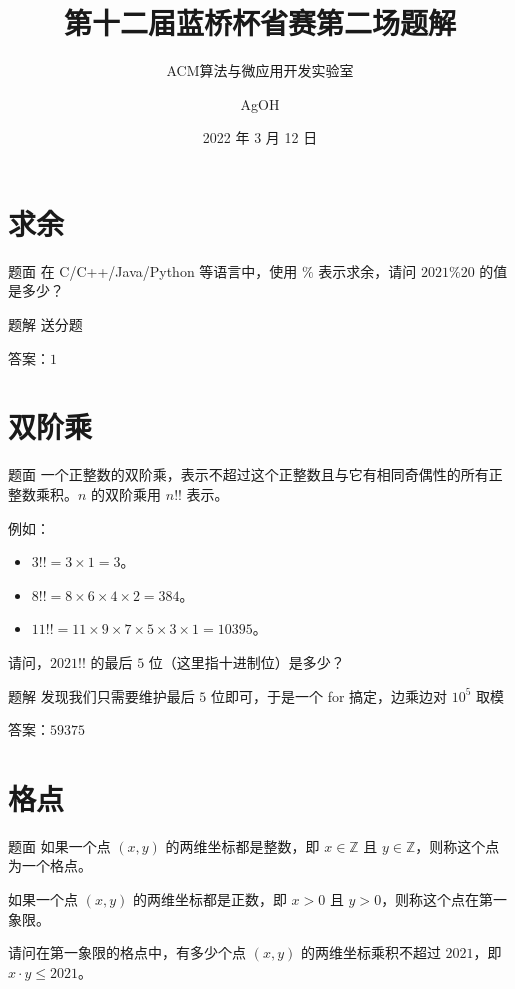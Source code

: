 \documentclass{pptt}
\title{第十二届蓝桥杯省赛第二场题解}
\author{ACM算法与微应用开发实验室 \and AgOH}
\date{2022 年 3 月 12 日}
\begin{document}
\maketitle

\section{求余}

\begin{frame}{题面}
    在 C/C++/Java/Python 等语言中，使用 $\%$ 表示求余，请问 $2021 \% 20$ 的值是多少？
\end{frame}

\begin{frame}{题解}
    送分题

    答案：$1$
\end{frame}

\section{双阶乘}

\begin{frame}{题面}
    一个正整数的双阶乘，表示不超过这个正整数且与它有相同奇偶性的所有正整数乘积。$n$ 的双阶乘用 $n!!$ 表示。

    例如：

    \begin{itemize}
        \item $3!! = 3 \times 1 = 3$。
        \item $8!! = 8 \times 6 \times 4 \times 2 = 384$。
        \item $11!! = 11 \times 9 \times 7 \times 5 \times 3 \times 1 = 10395$。
    \end{itemize}

    请问，$2021!!$ 的最后 $5$ 位（这里指十进制位）是多少？
\end{frame}

\begin{frame}{题解}
    发现我们只需要维护最后 $5$ 位即可，于是一个 for 搞定，边乘边对 ${10}^5$ 取模

    答案：$59375$
\end{frame}

\section{格点}

\begin{frame}{题面}
    如果一个点 $(x,y)$ 的两维坐标都是整数，即 $x \in \mathbb{Z}$ 且 $y \in \mathbb{Z}$，则称这个点为一个格点。

    如果一个点 $(x,y)$ 的两维坐标都是正数，即 $x>0$ 且 $y>0$，则称这个点在第一象限。

    请问在第一象限的格点中，有多少个点 $(x,y)$ 的两维坐标乘积不超过 $2021$，即 $x \cdot y \leq 2021$。
\end{frame}
\end{document}
